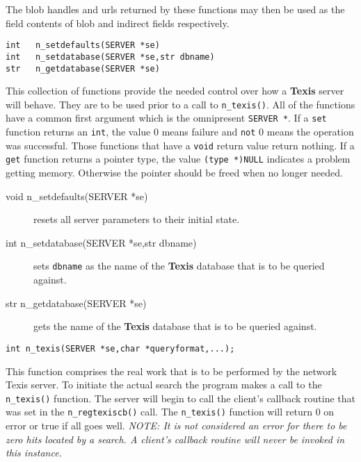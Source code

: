 The blob handles and urls returned by these functions may then be used
as the field contents of blob and indirect fields respectively.


\SYNOPSIS
\begin{verbatim}
int   n_setdefaults(SERVER *se)
int   n_setdatabase(SERVER *se,str dbname)
str   n_getdatabase(SERVER *se)
\end{verbatim}

\DESCRIPTION
This collection of functions provide the needed control over how a {\bf
Texis} server will behave.  They are to be used prior to a call to
\verb`n_texis()`.  All of the functions have a common first argument
which is the omnipresent \verb`SERVER *`.  If a \verb`set` function
returns an \verb`int`, the value 0 means failure and \verb`not` 0 means
the operation was successful.  Those functions that have a \verb`void`
return value return nothing.  If a \verb`get` function returns a pointer
type, the value \verb`(type *)NULL` indicates a problem getting memory.
Otherwise the pointer should be freed when no longer needed.

\begin{description}
\item[void  n\_setdefaults(SERVER *se)]

     resets all server parameters to their initial state.

\item[int   n\_setdatabase(SERVER *se,str dbname)]

     sets \verb`dbname` as the name of the {\bf Texis} database that is
     to be queried against.

\item[str   n\_getdatabase(SERVER *se)]

     gets the name of the {\bf Texis} database that is
     to be queried against.
\end{description}


\SYNOPSIS
\begin{verbatim}
int n_texis(SERVER *se,char *queryformat,...);
\end{verbatim}

\DESCRIPTION
This function comprises the real work that is to be performed by the
network Texis server.  To initiate the actual search the program makes a
call to the \verb`n_texis()` function.  The server will begin to call
the client's callback routine that was set in the \verb`n_regtexiscb()`
call.  The \verb`n_texis()` function will return 0 on error or true if
all goes well.  {\em NOTE:  It is not considered an error for there to
be zero hits located by a search.  A client's callback routine will
never be invoked in this instance.  }


